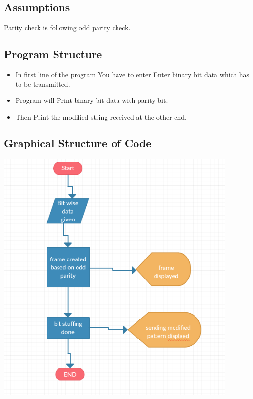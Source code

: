 \documentclass[12pt]{article}
\begin{document}
\subsection{Assumptions}
Parity check is following odd parity check.




\subsection{Program Structure}
\begin{itemize}


\item In first line of the program You have to enter Enter binary bit data which has to be transmitted.

\item Program will Print binary bit data with parity bit.

\item Then Print the modified string received at the other end.

\end{itemize}
\subsection{Graphical Structure of Code}

\includegraphics[width=0.9\textwidth]{flowpy1.png}
\end{document}
